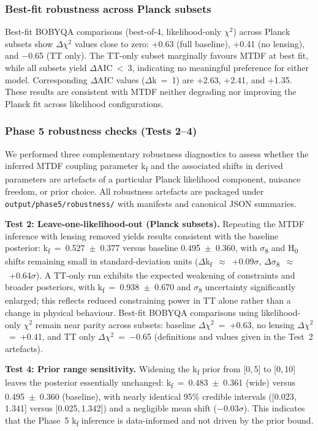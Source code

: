 \documentclass[11pt,a4paper]{article}
\begin{document}
\subsubsection{Best-fit robustness across Planck subsets}
Best-fit BOBYQA comparisons (best-of-4, likelihood-only $\chi$$^{2}$) across Planck subsets show $\Delta$$\chi$$^{2}$ values close to zero: +0.63 (full baseline), +0.41 (no lensing), and $-$0.65 (TT only). The TT-only subset marginally favours MTDF at best fit, while all subsets yield $\Delta$AIC~<~3, indicating no meaningful preference for either model. Corresponding $\Delta$AIC values ($\Delta$k~=~1) are +2.63, +2.41, and +1.35. These results are consistent with MTDF neither degrading nor improving the Planck fit across likelihood configurations.

\subsubsection{Phase 5 robustness checks (Tests 2--4)}
We performed three complementary robustness diagnostics to assess whether the inferred MTDF coupling parameter k\textsubscript{f} and the associated shifts in derived parameters are artefacts of a particular Planck likelihood component, nuisance freedom, or prior choice. All robustness artefacts are packaged under \texttt{output/\allowbreak{}phase5/\allowbreak{}robustness/\allowbreak{}} with manifests and canonical JSON summaries.

\textbf{Test 2: Leave-one-likelihood-out (Planck subsets).}
Repeating the MTDF inference with lensing removed yields results consistent with the baseline posterior: k\textsubscript{f}~=~0.527~$\pm$~0.377 versus baseline 0.495~$\pm$~0.360, with $\sigma$\textsubscript{8} and H\textsubscript{0} shifts remaining small in standard-deviation units ($\Delta$k\textsubscript{f}~$\approx$~+0.09$\sigma$, $\Delta$$\sigma$\textsubscript{8}~$\approx$~+0.64$\sigma$). A TT-only run exhibits the expected weakening of constraints and broader posteriors, with k\textsubscript{f}~=~0.938~$\pm$~0.670 and $\sigma$\textsubscript{8} uncertainty significantly enlarged; this reflects reduced constraining power in TT alone rather than a change in physical behaviour. Best-fit BOBYQA comparisons using likelihood-only $\chi$$^{2}$ remain near parity across subsets: baseline $\Delta$$\chi$$^{2}$~=~+0.63, no lensing $\Delta$$\chi$$^{2}$~=~+0.41, and TT only $\Delta$$\chi$$^{2}$~=~$-$0.65 (definitions and values given in the Test~2 artefacts).

\textbf{Test 4: Prior range sensitivity.}
Widening the k\textsubscript{f} prior from [0,\,5] to [0,\,10] leaves the posterior essentially unchanged: k\textsubscript{f}~=~0.483~$\pm$~0.361 (wide) versus 0.495~$\pm$~0.360 (baseline), with nearly identical 95\% credible intervals ([0.023,\,1.341] versus [0.025,\,1.342]) and a negligible mean shift ($-$0.03$\sigma$). This indicates that the Phase~5 k\textsubscript{f} inference is data-informed and not driven by the prior bound.
\end{document}
